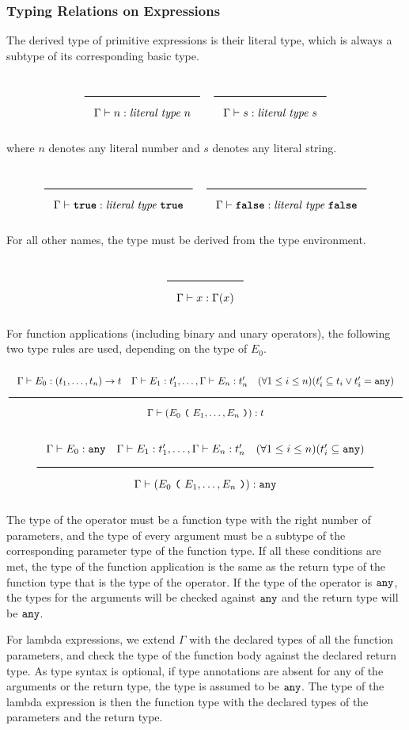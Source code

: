 \subsubsection{Typing Relations on Expressions}

The derived type of primitive expressions is their literal type, which is always a subtype of its corresponding basic type.

\noindent
\[
  \Rule{}{\Gamma \vdash n : \textit{literal type}\ n}
  \quad
  \Rule{}{\Gamma \vdash s : \textit{literal type}\ s}
\]
\noindent

where $n$ denotes any literal number and $s$ denotes any literal string.

\noindent
\[
  \Rule{}{\Gamma \vdash \TruE : \textit{literal type}\ \TruE}
  \quad
  \Rule{}{\Gamma \vdash \FalsE : \textit{literal type}\ \FalsE}
\]
\noindent

For all other names, the type must be derived from the type environment.

\noindent
\[
  \Rule{}{\Gamma \vdash x : \Gamma(x)}
\]
\noindent

For function applications (including binary and unary operators), the following two type rules are used, depending on the type of $E_0$.

\noindent
\[
\Rule{\Gamma \vdash E_0 : (t_1, \ldots, t_n) \rightarrow t \quad \Gamma \vdash E_1 : t'_1, \ldots,  \Gamma \vdash E_n : t'_n
  \quad (\forall 1 \leq i \leq n)(t'_i \subseteq t_i \vee t'_i = \Any)}{\Gamma \vdash (E_0\ \Lp \ E_1, \ldots, E_n\ \Rp) : t}
\]
\noindent
\[
  \Rule{\Gamma \vdash E_0 : \Any \quad \Gamma \vdash E_1 : t'_1, \ldots,  \Gamma \vdash E_n : t'_n
  \quad (\forall 1 \leq i \leq n)(t'_i \subseteq \Any)}{\Gamma \vdash (E_0\ \Lp \ E_1, \ldots, E_n\ \Rp) : \Any}
\]

The type of the operator must be a function type with the right number of parameters,
and the type of every argument must be a subtype of the corresponding parameter type of the function type.
If all these conditions are met, the type of the function application is the same
as the return type of the function type that is the type of the operator.
If the type of the operator is $\texttt{any}$, the types for the arguments will be checked against $\texttt{any}$ and the return type will be $\texttt{any}$.

For lambda expressions, we extend $\Gamma$ with the declared types of all the function parameters,
and check the type of the function body against the declared return type.
As type syntax is optional, if type annotations are absent for any of the arguments or the return type, the type is assumed to be $\texttt{any}$.
The type of the lambda expression is then the function type with the declared types of the parameters and the return type. 

